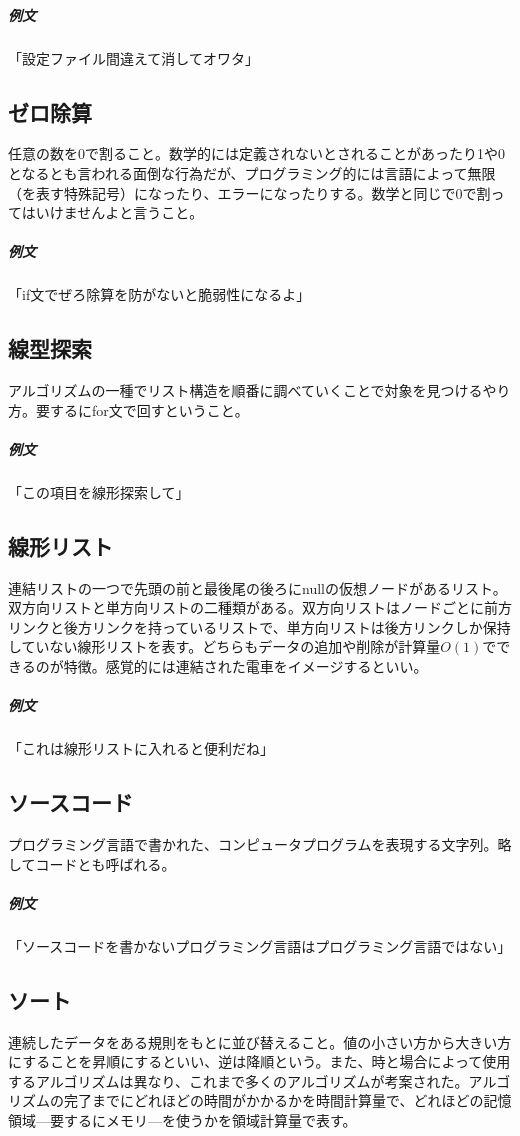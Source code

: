 \documentclass[dvipdfmx,jb5]{jreport}
\begin{document}
\subparagraph{例文}「設定ファイル間違えて消してオワタ」

\subsection{ゼロ除算}
任意の数を0で割ること。数学的には定義されないとされることがあったり1や0となるとも言われる面倒な行為だが、プログラミング的には言語によって無限（を表す特殊記号）になったり、エラーになったりする。数学と同じで0で割ってはいけませんよと言うこと。

\subparagraph{例文}「if文でぜろ除算を防がないと脆弱性になるよ」

\subsection{線型探索}
アルゴリズムの一種でリスト構造を順番に調べていくことで対象を見つけるやり方。要するにfor文で回すということ。

\subparagraph{例文}「この項目を線形探索して」

\subsection{線形リスト}
連結リストの一つで先頭の前と最後尾の後ろにnullの仮想ノードがあるリスト。双方向リストと単方向リストの二種類がある。双方向リストはノードごとに前方リンクと後方リンクを持っているリストで、単方向リストは後方リンクしか保持していない線形リストを表す。どちらもデータの追加や削除が計算量$O(1)$でできるのが特徴。感覚的には連結された電車をイメージするといい。

\subparagraph{例文}「これは線形リストに入れると便利だね」

\subsection{ソースコード}
プログラミング言語で書かれた、コンピュータプログラムを表現する文字列。略してコードとも呼ばれる。

\subparagraph{例文}「ソースコードを書かないプログラミング言語はプログラミング言語ではない」

\subsection{ソート}
連続したデータをある規則をもとに並び替えること。値の小さい方から大きい方にすることを昇順にするといい、逆は降順という。また、時と場合によって使用するアルゴリズムは異なり、これまで多くのアルゴリズムが考案された。アルゴリズムの完了までにどれほどの時間がかかるかを時間計算量で、どれほどの記憶領域---要するにメモリ---を使うかを領域計算量で表す。
\end{document}
